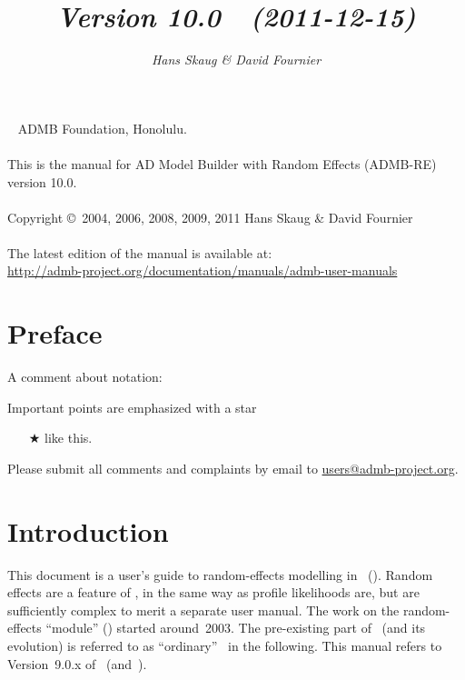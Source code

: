 \documentclass{admbmanual}
\begin{document}
\title{%
    \vspace{4.5ex}\textsf{\textit{Version 10.0~~(2011-12-15)}}\vspace{3ex}
}
\author{\textsf{\textit{Hans Skaug \& David Fournier}}}

\maketitle

~\vfill
\noindent ADMB Foundation, Honolulu.\\\\
\noindent This is the manual for AD Model Builder with Random Effects (ADMB-RE)
version 10.0.\\\\
\noindent Copyright \copyright\ 2004, 2006, 2008, 2009, 2011 Hans Skaug \& David
Fournier\\\\
\noindent The latest edition of the manual is available at:\\
\url{http://admb-project.org/documentation/manuals/admb-user-manuals}

\tableofcontents

\chapter*{Preface}

A comment about notation:

Important points are emphasized with a star
\begin{itemize}
  \item[$\bigstar$] like this.
\end{itemize}

Please submit all comments and complaints by email to
\href{mailto:users@admb-project.org}{users@admb-project.org}.

\chapter{Introduction}

This document is a user's guide to random-effects modelling in \ADM\ (\scAB).
Random effects are a feature of \scAB, in the same way as profile likelihoods
are, but are sufficiently complex to merit a separate user manual. The work on
the random-effects ``module'' (\scAR) started around~2003. The pre-existing part
of \scAB\ (and its evolution) is referred to as ``ordinary'' \scAB\ in the
following. This manual refers to Version~9.0.x of \scAB\ (and~\scAR).
\end{document}
